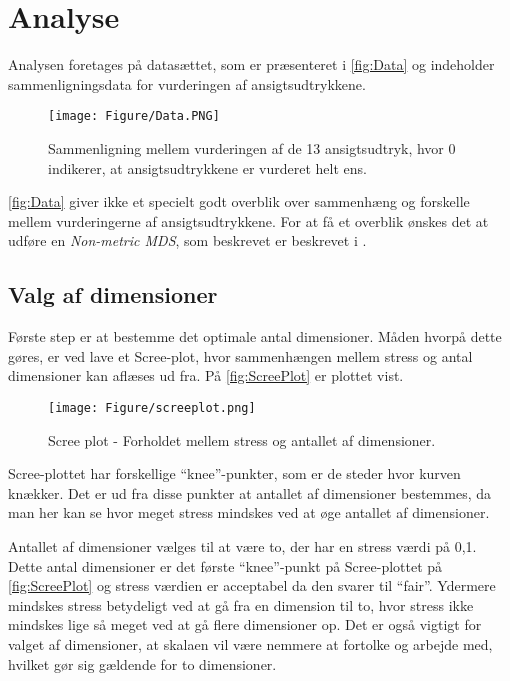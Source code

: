 \section*{Analyse}
\label{Analyse}
%
Analysen foretages på datasættet, som er præsenteret i \autoref{fig:Data} og indeholder sammenligningsdata for vurderingen af ansigtsudtrykkene. 

\begin{figure}[H]
\centering
\texttt{[image: Figure/Data.PNG]} 
\caption{Sammenligning mellem vurderingen af de 13 ansigtsudtryk, hvor 0 indikerer, at ansigtsudtrykkene er vurderet helt ens.}
\label{fig:Data}
\end{figure}

\noindent \autoref{fig:Data} giver ikke et specielt godt overblik over sammenhæng og forskelle mellem vurderingerne af ansigtsudtrykkene. For at få et overblik ønskes det at udføre en \textit{Non-metric MDS}, som beskrevet er beskrevet i . 

\subsection*{Valg af dimensioner}
Første step er at bestemme det optimale antal dimensioner. Måden hvorpå dette gøres, er ved lave et Scree-plot, hvor sammenhængen mellem stress og antal dimensioner kan aflæses ud fra. På \autoref{fig:ScreePlot} er plottet vist. 

\begin{figure}[H]
\centering
\texttt{[image: Figure/screeplot.png]} 
\caption{Scree plot - Forholdet mellem stress og antallet af dimensioner.}
\label{fig:ScreePlot}
\end{figure}

\noindent Scree-plottet har forskellige ``knee''-punkter, som er de steder hvor kurven knækker. Det er ud fra disse punkter at antallet af dimensioner bestemmes, da man her kan se hvor meget stress mindskes ved at øge antallet af dimensioner. 

\noindent Antallet af dimensioner vælges til at være to, der har en stress værdi på 0,1. Dette antal dimensioner er det første ``knee''-punkt på Scree-plottet på \autoref{fig:ScreePlot} og stress værdien er acceptabel da den svarer til ``fair''. Ydermere mindskes stress betydeligt ved at gå fra en dimension til to, hvor stress ikke mindskes lige så meget ved at gå flere dimensioner op. Det er også vigtigt for valget af dimensioner, at skalaen vil være nemmere at fortolke og arbejde med, hvilket gør sig gældende for to dimensioner.

